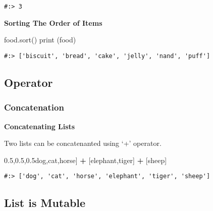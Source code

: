 \documentclass[
]{book}
\newenvironment{Shaded}{\begin{snugshade}}{\end{snugshade}}
\newcommand{\BuiltInTok}[1]{#1}
\newcommand{\NormalTok}[1]{#1}
\newcommand{\OperatorTok}[1]{\textcolor[rgb]{0.43,0.43,0.43}{\textbf{#1}}}
\newcommand{\StringTok}[1]{\textcolor[rgb]{0.5,0.5,0.5}{#1}}
\begin{document}
\begin{verbatim}
#:> 3
\end{verbatim}

\textbf{Sorting The Order of Items}

\begin{Shaded}
\begin{Highlighting}[]
\NormalTok{food.sort()}
\BuiltInTok{print}\NormalTok{ (food)}
\end{Highlighting}
\end{Shaded}

\begin{verbatim}
#:> ['biscuit', 'bread', 'cake', 'jelly', 'nand', 'puff']
\end{verbatim}

\hypertarget{operator-1}{%
\subsection{Operator}\label{operator-1}}

\hypertarget{concatenation-1}{%
\subsubsection{Concatenation}\label{concatenation-1}}

\textbf{Concatenating Lists}

Two lists can be concatenanted using `+' operator.

\begin{Shaded}
\begin{Highlighting}[]
\NormalTok{[}\StringTok{\textquotesingle{}dog\textquotesingle{}}\NormalTok{,}\StringTok{\textquotesingle{}cat\textquotesingle{}}\NormalTok{,}\StringTok{\textquotesingle{}horse\textquotesingle{}}\NormalTok{] }\OperatorTok{+}\NormalTok{ [}\StringTok{\textquotesingle{}elephant\textquotesingle{}}\NormalTok{,}\StringTok{\textquotesingle{}tiger\textquotesingle{}}\NormalTok{] }\OperatorTok{+}\NormalTok{ [}\StringTok{\textquotesingle{}sheep\textquotesingle{}}\NormalTok{]}
\end{Highlighting}
\end{Shaded}

\begin{verbatim}
#:> ['dog', 'cat', 'horse', 'elephant', 'tiger', 'sheep']
\end{verbatim}

\hypertarget{list-is-mutable}{%
\subsection{List is Mutable}\label{list-is-mutable}}
\end{document}

